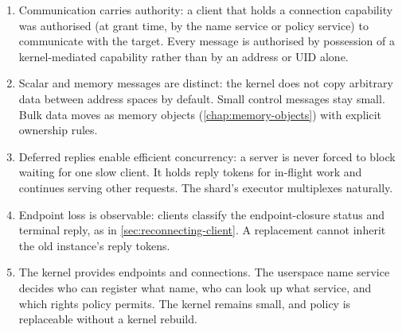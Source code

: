 \begin{enumerate}
    \item Communication carries authority: a client that
        holds a connection capability was authorised (at grant time, by the name
        service or policy service) to communicate with the target. Every message
        is authorised by possession of a kernel-mediated capability rather than
        by an address or UID alone.

    \item Scalar and memory messages are distinct: the kernel does not
        copy arbitrary data between address spaces by default. Small control
        messages stay small. Bulk data moves as memory objects
        (\autoref{chap:memory-objects}) with
        explicit ownership rules.

    \item Deferred replies enable efficient concurrency: a server is never
        forced to block waiting for one slow client. It holds reply tokens for
        in-flight work and continues serving other requests. The shard's executor
        multiplexes naturally.

    \item Endpoint loss is observable: clients classify the endpoint-closure
        status and terminal reply, as in \autoref{sec:reconnecting-client}.
        A replacement cannot inherit the old instance's reply tokens.

    \item The kernel provides endpoints and connections. The userspace name
        service decides who can register what name,
        who can look up what service, and which rights policy permits. The
        kernel remains small, and policy is replaceable without a kernel rebuild.
\end{enumerate}

\endinput

